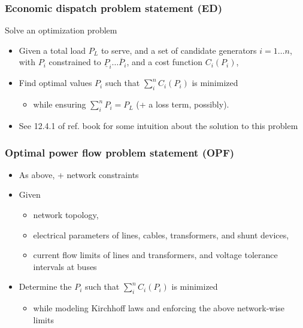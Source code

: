 \begin{frame}
    \frametitle{Economic dispatch problem statement (ED)}
    Solve an optimization problem
    \begin{itemize}
        \item Given a total load $P_L$ to serve, and a set of candidate generators $i=1\ldots n$, with $P_i$ constrained to $\underline{P}_i \ldots \overline{P}_i$, and a cost function $C_i(P_i)$,
        \item Find optimal values $P_i$ such that $\sum_i^n C_i(P_i)$ is minimized
        \begin{itemize}
            \item while ensuring $\sum_i^n P_i = P_L$ (+ a loss term, possibly).
        \end{itemize}
        \item See 12.4.1 of ref. book for some intuition about the solution to this problem
    \end{itemize}
\end{frame}

\begin{frame}
    \frametitle{Optimal power flow problem statement (OPF)}
    \begin{itemize}
        \item As above, + network constraints
        \item Given
        \begin{itemize}
            \item network topology,
            \item electrical parameters of lines, cables, transformers, and shunt devices,
            \item current flow limits of lines and transformers, and voltage tolerance intervals at buses
        \end{itemize}
        \item Determine the $P_i$ such that $\sum_i^n C_i(P_i)$ is minimized
        \begin{itemize}
            \item while modeling Kirchhoff laws and enforcing the above network-wise limits
        \end{itemize}
    \end{itemize}
\end{frame}

